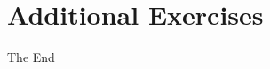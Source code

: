 % 
% 
% 
% 
% 

\newpage\section{Additional Exercises}

\newpage
\begin{center}
    {\LARGE The End}
\end{center}
\newpage



